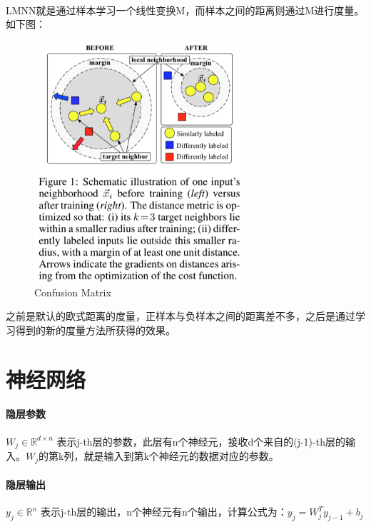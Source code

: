 \documentclass[10pt,letterpaper]{article}
\begin{document}
\paragraph{} LMNN就是通过样本学习一个线性变换M，而样本之间的距离则通过M进行度量。如下图：
\begin{figure}[H] %
	\centering %
	\includegraphics[width=0.7\textwidth]{../images/lmnn.png} %
	\caption{Confusion Matrix} %
	\label{Fig.main2} %
\end{figure}
之前是默认的欧式距离的度量，正样本与负样本之间的距离差不多，之后是通过学习得到的新的度量方法所获得的效果。

\newpage
\section{神经网络}

\paragraph{隐层参数} $W_j \in \mathbb{R}^{d  \times n}$ 表示j-th层的参数，此层有n个神经元，接收d个来自的(j-1)-th层的输入。$W_j$的第k列，就是输入到第k个神经元的数据对应的参数。
\paragraph{隐层输出} $y_j \in \mathbb{R}^n$ 表示j-th层的输出，n个神经元有n个输出，计算公式为：$y_j = W_j^Ty_{j-1}+b_j$
\end{document}
